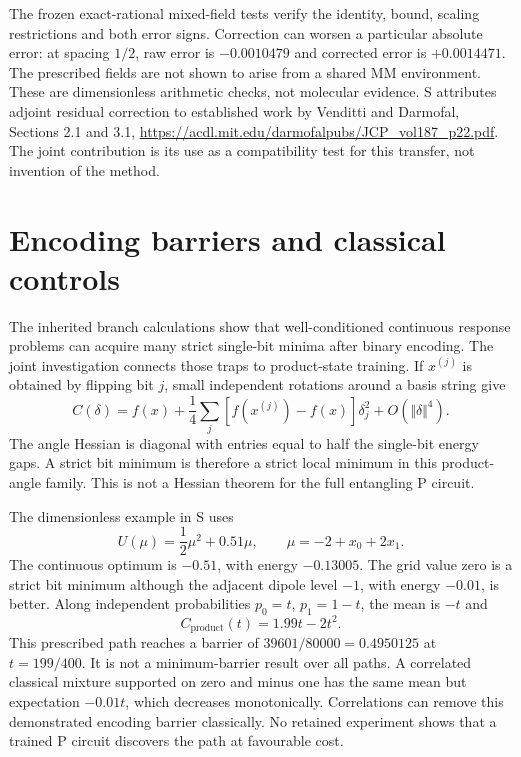 \documentclass{article}
\begin{document}
The frozen exact-rational mixed-field tests verify the identity, bound, scaling restrictions and both error signs. Correction can worsen a particular absolute error: at spacing $1/2$, raw error is $-0.0010479$ and corrected error is $+0.0014471$. The prescribed fields are not shown to arise from a shared MM environment. These are dimensionless arithmetic checks, not molecular evidence. S attributes adjoint residual correction to established work by Venditti and Darmofal, Sections 2.1 and 3.1, \url{https://acdl.mit.edu/darmofalpubs/JCP_vol187_p22.pdf}. The joint contribution is its use as a compatibility test for this transfer, not invention of the method.

\section{Encoding barriers and classical controls}

The inherited branch calculations show that well-conditioned continuous response problems can acquire many strict single-bit minima after binary encoding. The joint investigation connects those traps to product-state training. If $x^{(j)}$ is obtained by flipping bit $j$, small independent rotations around a basis string give
\begin{equation}
C(\delta)=f(x)+\frac14\sum_j\left[f(x^{(j)})-f(x)\right]\delta_j^2+O(\Vert\delta\Vert^4).
\end{equation}
The angle Hessian is diagonal with entries equal to half the single-bit energy gaps. A strict bit minimum is therefore a strict local minimum in this product-angle family. This is not a Hessian theorem for the full entangling P circuit.

The dimensionless example in S uses
\begin{equation}
U(\mu)=\frac12\mu^2+0.51\mu,\qquad \mu=-2+x_0+2x_1.
\end{equation}
The continuous optimum is $-0.51$, with energy $-0.13005$. The grid value zero is a strict bit minimum although the adjacent dipole level $-1$, with energy $-0.01$, is better. Along independent probabilities $p_0=t$, $p_1=1-t$, the mean is $-t$ and
\begin{equation}
C_{\mathrm{product}}(t)=1.99t-2t^2.
\end{equation}
This prescribed path reaches a barrier of $39601/80000=0.4950125$ at $t=199/400$. It is not a minimum-barrier result over all paths. A correlated classical mixture supported on zero and minus one has the same mean but expectation $-0.01t$, which decreases monotonically. Correlations can remove this demonstrated encoding barrier classically. No retained experiment shows that a trained P circuit discovers the path at favourable cost.
\end{document}
